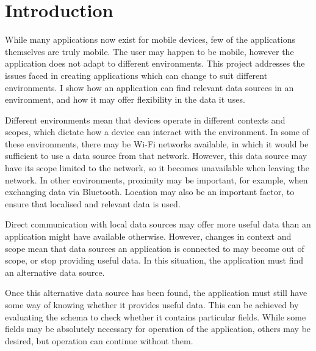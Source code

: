 \documentclass[12pt,twoside,notitlepage]{report}
\begin{document}
\tableofcontents

\listoffigures

\newpage


\cleardoublepage        %

\setcounter{page}{1}
\pagestyle{headings}

\chapter{Introduction}

While many applications now exist for mobile devices, few of the applications themselves are truly mobile. 
The user may happen to be mobile, however the application does not adapt to different environments. 
This project addresses the issues faced in creating applications which can change to suit different environments. 
I show how an application can find relevant data sources in an environment, and how it may offer flexibility in the data it uses.

Different environments mean that devices operate in different contexts and scopes, which dictate how a device can interact with the environment. 
In some of these environments, there may be Wi-Fi networks available, in which it would be sufficient to use a data source from that network. 
However, this data source may have its scope limited to the network, so it becomes unavailable when leaving the network.
In other environments, proximity may be important, for example, when exchanging data via Bluetooth. 
Location may also be an important factor, to ensure that localised and relevant data is used.

Direct communication with local data sources may offer more useful data than an application might have available otherwise. 
However, changes in context and scope mean that data sources an application is connected to may become out of scope, or stop providing useful data. 
In this situation, the application must find an alternative data source.

Once this alternative data source has been found, the application must still have some way of knowing whether it provides useful data. 
This can be achieved by evaluating the schema to check whether it contains particular fields. 
While some fields may be absolutely necessary for operation of the application, others may be desired, but operation can continue without them.
\end{document}

